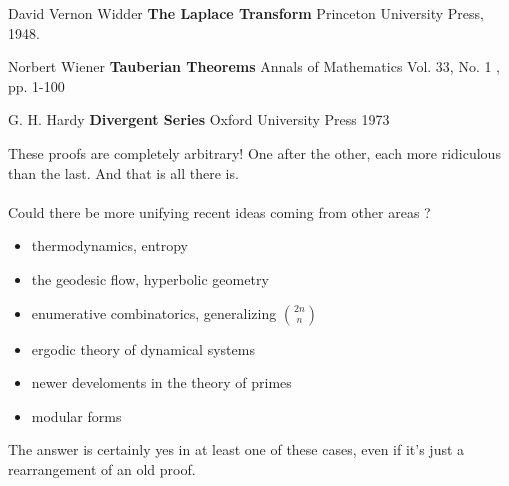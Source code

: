 \documentclass[12pt]{article}
\begin{document}
\selectfont \fontsize{12}{10}\selectfont


\begin{thebibliography}{}

\item David Vernon Widder \textbf{The Laplace Transform} Princeton University Press, 1948.

\item Norbert Wiener \textbf{Tauberian Theorems} Annals of Mathematics Vol. 33, No. 1 , pp. 1-100

\item G. H. Hardy \textbf{Divergent Series} Oxford University Press 1973

\end{thebibliography}

\newpage

\selectfont \fontsize{25}{30}\selectfont

\noindent These proofs are completely arbitrary!  One after the other, each more ridiculous than the last.  And that is all there is. \\ \\
Could there be more unifying recent ideas coming from other areas ?
\begin{itemize}
\item thermodynamics, entropy
\item the geodesic flow, hyperbolic geometry
\item enumerative combinatorics, generalizing $\binom{2n}{n}$
\item ergodic theory of dynamical systems
\item newer develoments in the theory of primes
\item modular forms \\
\end{itemize}
The answer is certainly yes in at least one of these cases, even if it's just a rearrangement of an old proof.
\end{document}
